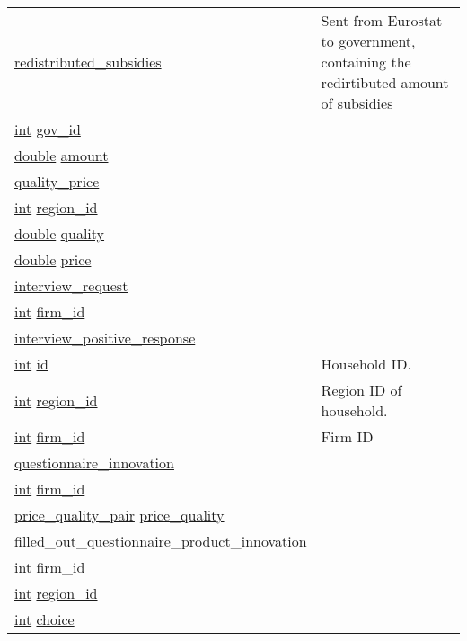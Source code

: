 \documentclass[a4paper,11pt]{article}
\begin{document}
\begin{longtable}[H!]{ll}
\midrule
\url{redistributed_subsidies} & \parbox{10cm}{Sent from Eurostat to government, containing the redirtibuted amount of subsidies}\\
    \url{int} \url{gov_id}  & \parbox{10cm}{}\\
    \url{double} \url{amount}  & \parbox{10cm}{}\\
\midrule
\url{quality_price} & \parbox{10cm}{}\\
    \url{int} \url{region_id}  & \parbox{10cm}{}\\
    \url{double} \url{quality}  & \parbox{10cm}{}\\
    \url{double} \url{price}  & \parbox{10cm}{}\\
\midrule
\url{interview_request} & \parbox{10cm}{}\\
    \url{int} \url{firm_id}  & \parbox{10cm}{}\\
\midrule
\url{interview_positive_response} & \parbox{10cm}{}\\
    \url{int} \url{id}  & \parbox{10cm}{Household ID.}\\
    \url{int} \url{region_id}  & \parbox{10cm}{Region ID of household.}\\
    \url{int} \url{firm_id}  & \parbox{10cm}{Firm ID}\\
\midrule
\url{questionnaire_innovation} & \parbox{10cm}{}\\
    \url{int} \url{firm_id}  & \parbox{10cm}{}\\
    \url{price_quality_pair} \url{price_quality}  & \parbox{10cm}{}\\
\midrule
\url{filled_out_questionnaire_product_innovation} & \parbox{10cm}{}\\
    \url{int} \url{firm_id}  & \parbox{10cm}{}\\
    \url{int} \url{region_id}  & \parbox{10cm}{}\\
    \url{int} \url{choice}  & \parbox{10cm}{}\\
\end{longtable}
\end{document}
